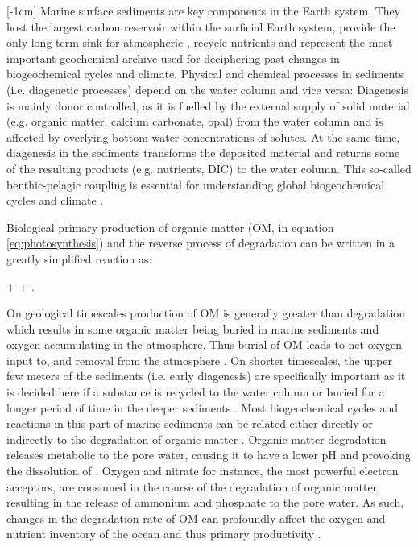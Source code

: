\documentclass[gmd, manuscript]{copernicus}
\begin{document}
\introduction  %
[-1cm]%
Marine surface sediments are key components in the Earth system. They host the largest carbon reservoir within the surficial Earth system, provide the only long term sink for atmospheric , 
recycle nutrients and represent the most important geochemical archive used for deciphering past changes in biogeochemical cycles and climate. 
Physical and chemical processes in sediments (i.e. diagenetic processes) depend on the water column and vice versa: Diagenesis is mainly donor controlled, as it is fuelled by the external supply of solid material 
(e.g. organic matter, calcium carbonate, opal) from the water column and is affected by overlying bottom water concentrations of solutes. 
At the same time, diagenesis in the sediments transforms the deposited material and returns some of the resulting products (e.g. nutrients, DIC) to the water column. 
This so-called benthic-pelagic coupling is essential for understanding global biogeochemical cycles and climate \citep[e.g.][]{archer_effect_1994, soetaert_coupling_2000, archer_what_2000, mackenzie_sediments_2005}. 

Biological primary production of organic matter (OM,  in equation \ref{eq:photosynthesis}) and the reverse process of degradation can be written in a greatly simplified reaction as:
\begin{reaction}
+ \rightleftharpoons {} + .\label{eq:photosynthesis}
\end{reaction}
On geological timescales production of OM is generally greater than degradation which results in some organic matter being buried in marine sediments and oxygen accumulating in the atmosphere. 
Thus burial of OM leads to net oxygen input to, and  removal from the atmosphere \citep{berner_phanerozoic_2004}. 
On shorter timescales, the upper few meters of the sediments (i.e. early diagenesis) are specifically important as it is decided here if a substance is recycled to the water column or buried for a longer period of time in the 
deeper sediments \citep{hensen_benthic_2006}. 
Most biogeochemical cycles and reactions in this part of marine sediments can be related either directly or indirectly to the degradation of organic matter \citep[e.g][]{boudreau_reactive_1991, arndt_quantifying_2013}. 
Organic matter degradation releases metabolic  to the pore water, causing it to have a lower pH and provoking the dissolution of  \citep{emerson_carbon_1981}.
Oxygen and nitrate for instance, the most powerful electron acceptors, are consumed in the course of the degradation of organic matter, resulting in the release of ammonium and phosphate to the pore water. 
As such, changes in the degradation rate of OM can profoundly affect the oxygen and nutrient inventory of the ocean and thus primary productivity \citep{van_cappellen_benthic_1994, lenton_redfield_2000}. 
\end{document}
